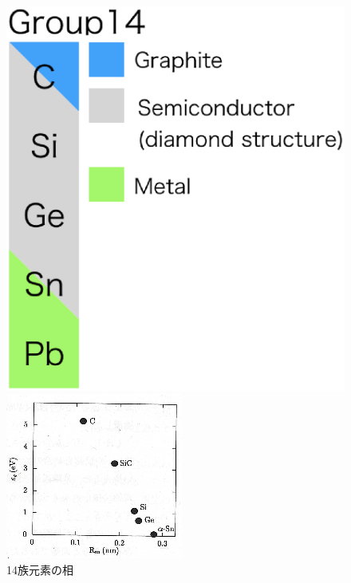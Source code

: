 \begin{figure}[!h]
 \begin{minipage}{0.4\hsize}
  \begin{center}
   \includegraphics[width=\hsize]{Introduction/group14.eps}
  \end{center}
  \caption{14族元素の相}
  \label{fig:group14}
 \end{minipage}
 \begin{minipage}{0.6\hsize}
  \begin{center}
   \includegraphics[width=\hsize]{Introduction/bandgaps.eps}

\end{center}
\end{minipage}
\end{figure}
